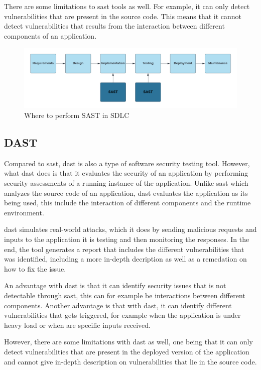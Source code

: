 There are some limitations to \acrshort{sast} tools as well. For example, it can only detect vulnerabilities that are present in the source code. This means that it cannot detect vulnerabilities that results from the interaction between different components of an application.
\begin{figure}[htp]
    \centering
    \includegraphics[width=1\columnwidth]{Images/SAST.png}
    \caption{Where to perform SAST in SDLC}
    \label{fig:my_label}
\end{figure}

\newpage
\subsection{DAST}
Compared to \acrshort{sast}, \acrlong{dast} is also a type of software security testing tool. However, what \acrshort{dast} does is that it evaluates the security of an application by performing security assessments of a running instance of the application. Unlike \acrshort{sast} which analyzes the source code of an application, \acrshort{dast} evaluates the application as its being used, this include the interaction of different components and the runtime environment. 

\acrshort{dast} simulates real-world attacks, which it does by sending malicious requests and inputs to the application it is testing and then monitoring the responses. In the end, the tool generates a report that includes the different vulnerabilities that was identified, including a more in-depth decription as well as a remedation on how to fix the issue. \cite{dast}

An advantage with \acrshort{dast} is that it can identify security issues that is not detectable through \acrshort{sast}, this can for example be interactions between different components. Another advantage is that with \acrshort{dast}, it can identify different vulnerabilities that gets triggered, for example when the application is under heavy load or when are specific inputs received.

However, there are some limitations with \acrshort{dast} as well, one being that it can only detect vulnerabilities that are present in the deployed version of the application and cannot give in-depth description on vulnerabilities that lie in the source code.

